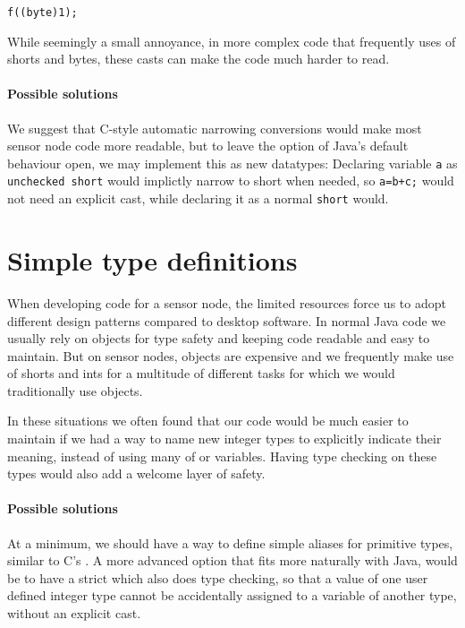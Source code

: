 \texttt{f((byte)1);}

While seemingly a small annoyance, in more complex code that frequently uses of shorts and bytes, these casts can make the code much harder to read.

\paragraph{Possible solutions}

We suggest that C-style automatic narrowing conversions would make most sensor node code more readable, but to leave the option of Java's default behaviour open, we may implement this as new datatypes: Declaring variable \texttt{a} as \texttt{unchecked short} would implictly narrow to short when needed, so \texttt{a=b+c;} would not need an explicit cast, while declaring it as a normal \texttt{short} would.




\section{Simple type definitions}
\label{sec-typedef}
When developing code for a sensor node, the limited resources force us to adopt different design patterns compared to desktop software. In normal Java code we usually rely on objects for type safety and keeping code readable and easy to maintain. But on sensor nodes, objects are expensive and we frequently make use of shorts and ints for a multitude of different tasks for which we would traditionally use objects.

In these situations we often found that our code would be much easier to maintain if we had a way to name new integer types to explicitly indicate their meaning, instead of using many of  or  variables. Having type checking on these types would also add a welcome layer of safety.

\paragraph{Possible solutions}
At a minimum, we should have a way to define simple aliases for primitive types, similar to C's . A more advanced option that fits more naturally with Java, would be to have a strict  which also does type checking, so that a value of one user defined integer type cannot be accidentally assigned to a variable of another type, without an explicit cast.




